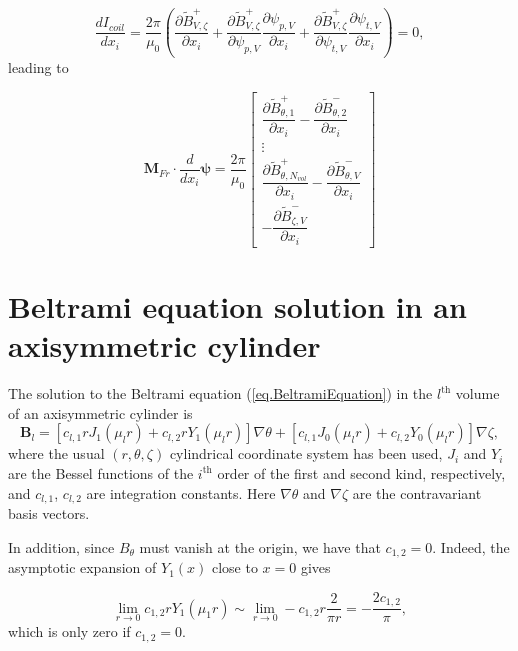 \begin{equation}
	\frac{dI_{coil}}{dx_i} = \frac{2\pi}{\mu_0}\left( \frac{\partial  \tilde{B}^+_{V,\zeta}}{\partial x_i} + \frac{\partial  \tilde{B}^+_{V,\zeta}}{\partial \psi_{p,V}}\frac{\partial\psi_{p,V}}{\partial x_i} +  \frac{\partial  \tilde{B}^+_{V,\zeta}}{\partial \psi_{t,V}}\frac{\partial \psi_{t,V}}{\partial x_i} \right)   =0,
\end{equation}
leading to

\begin{equation}
	\mathbf{M}_{Fr} \cdot 
	\dfrac{d}{dx_i}\bm{\psi} = \frac{2\pi}{\mu_0} \begin{bmatrix}
		\dfrac{\partial \tilde{B}^+_{\theta,1}}{\partial x_i} - \dfrac{\partial \tilde{B}^-_{\theta,2}}{\partial x_i} \\
		\vdots \\
		\dfrac{\partial \tilde{B}^+_{\theta,N_{vol}} } {\partial x_i} - \dfrac{\partial \tilde{B}^-_{\theta,V}}{\partial x_i} \\
		-\dfrac{\partial\tilde{B}^-_{\zeta,V}}{\partial x_i}
	\end{bmatrix}
\end{equation}



\chapter{Beltrami equation solution in an axisymmetric cylinder}\label{appB}

The solution to the Beltrami equation (\ref{eq.BeltramiEquation}) in the $l^{\text{th}}$ volume of an axisymmetric cylinder is
	\begin{equation}
		\mathbf{B}_l = \left[c_{l,1}rJ_1(\mu_l r) + c_{l,2}rY_1(\mu_lr)\right] \nabla\theta + \left[c_{l,1}J_0(\mu_l r) + c_{l,2}Y_0(\mu_lr)\right] \nabla\zeta,
\end{equation}
where the usual $(r,\theta,\zeta)$ cylindrical coordinate system has been used, $J_i$ and $Y_i$ are the Bessel functions of the $i^\text{th}$ order of the first and second kind, respectively, and $c_{l,1}$, $c_{l,2}$ are integration constants. Here $\nabla\theta$ and $\nabla\zeta$ are the contravariant basis vectors.

In addition, since $B_\theta$ must vanish at the origin, we have that $c_{1,2}=0$. Indeed, the asymptotic expansion of $Y_1(x)$ close to $x=0$ gives \citep{abramowitzHandbookMathematicalFunctions1964}

\begin{equation}
	\lim_{r\rightarrow 0} c_{1,2}rY_1(\mu_1 r) \sim \lim_{r\rightarrow 0} -c_{1,2}r\frac{2}{\pi r} = -\frac{2c_{1,2}}{\pi},
\end{equation}
which is only zero if $c_{1,2}=0$. 

